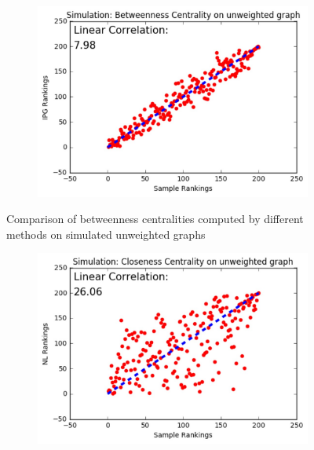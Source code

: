 \documentclass[10pt]{beamer}
\begin{document}
\begin{frame}
\begin{figure}[H]
\begin{subfigure}{.32\textwidth}
	\centering
    \includegraphics[width=0.95\linewidth]{BCU_IPG.jpeg}
\end{subfigure}
\caption{Comparison of betweenness centralities computed by different methods on simulated unweighted graphs}
\end{figure}
\vspace{-0.1in}
\begin{figure}[H]
\centering
\begin{subfigure}{.32\textwidth}
  \centering
  \includegraphics[width=0.95\linewidth]{CCU_NL.jpeg}
\end{subfigure}
\begin{subfigure}{.32\textwidth}
	\centering

\end{subfigure}
\end{figure}
\end{frame}
\end{document}

